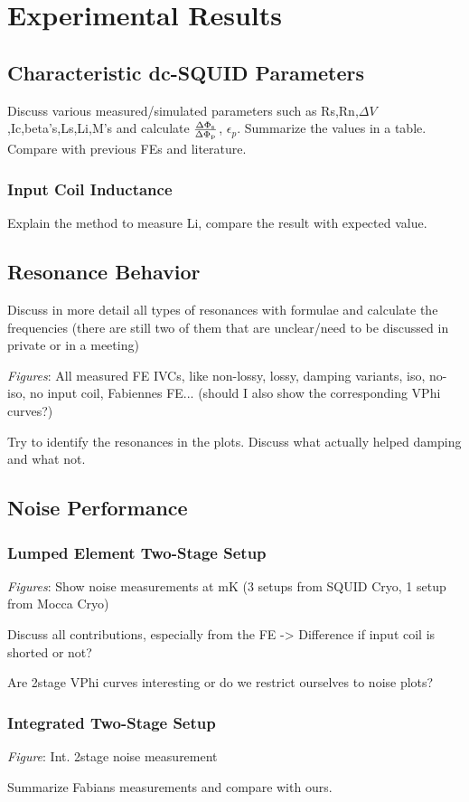 \chapter{Experimental Results}

\section{Characteristic dc-SQUID Parameters}

Discuss various measured/simulated parameters such as Rs,Rn,$\Delta V$,Ic,beta's,Ls,Li,M's and calculate $\frac{\Delta\Phi_{\rm s}}{\Delta\Phi_{\rm p}}$, $\epsilon_p$. Summarize the values in a table. Compare with previous FEs and literature. 

\subsection{Input Coil Inductance}

Explain the method to measure Li, compare the result with expected value.

\section{Resonance Behavior}

Discuss in more detail all types of resonances with formulae and calculate the frequencies (there are still two of them that are unclear/need to be discussed in private or in a meeting)

\textit{Figures}: All measured FE IVCs, like non-lossy, lossy, damping variants, iso, no-iso, no input coil, Fabiennes FE... (should I also show the corresponding VPhi curves?)

Try to identify the resonances in the plots. Discuss what actually helped damping and what not. 

\section{Noise Performance}

\subsection{Lumped Element Two-Stage Setup}

\textit{Figures}: Show noise measurements at mK (3 setups from SQUID Cryo, 1 setup from Mocca Cryo) 

Discuss all contributions, especially from the FE -> Difference if input coil is shorted or not?

Are 2stage VPhi curves interesting or do we restrict ourselves to noise plots?

\subsection{Integrated Two-Stage Setup}

\textit{Figure}: Int. 2stage noise measurement

Summarize Fabians measurements and compare with ours. 
